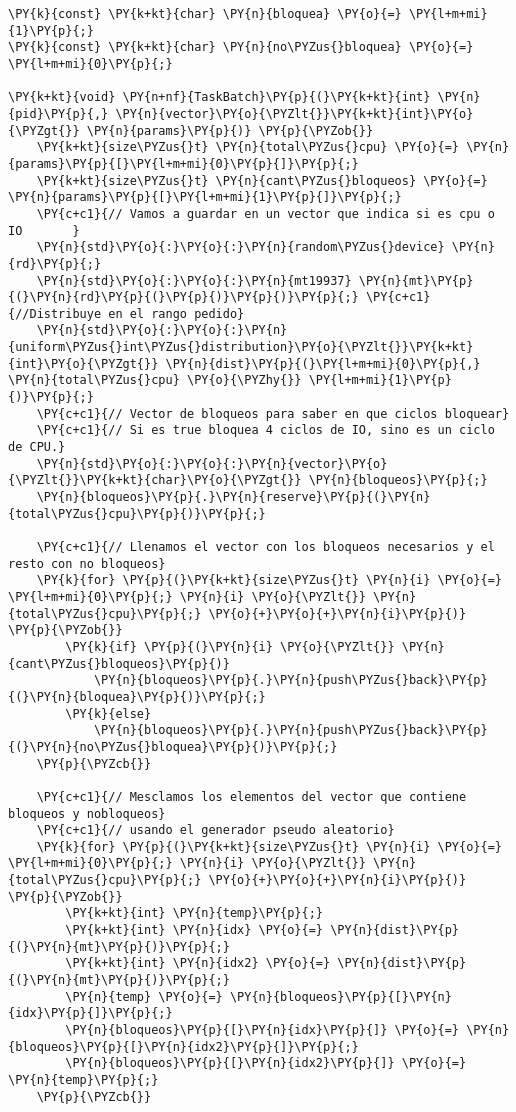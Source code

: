 \begin{Verbatim}[commandchars=\\\{\}]
\PY{k}{const} \PY{k+kt}{char} \PY{n}{bloquea} \PY{o}{=} \PY{l+m+mi}{1}\PY{p}{;}
\PY{k}{const} \PY{k+kt}{char} \PY{n}{no\PYZus{}bloquea} \PY{o}{=} \PY{l+m+mi}{0}\PY{p}{;}

\PY{k+kt}{void} \PY{n+nf}{TaskBatch}\PY{p}{(}\PY{k+kt}{int} \PY{n}{pid}\PY{p}{,} \PY{n}{vector}\PY{o}{\PYZlt{}}\PY{k+kt}{int}\PY{o}{\PYZgt{}} \PY{n}{params}\PY{p}{)} \PY{p}{\PYZob{}}
    \PY{k+kt}{size\PYZus{}t} \PY{n}{total\PYZus{}cpu} \PY{o}{=} \PY{n}{params}\PY{p}{[}\PY{l+m+mi}{0}\PY{p}{]}\PY{p}{;}
    \PY{k+kt}{size\PYZus{}t} \PY{n}{cant\PYZus{}bloqueos} \PY{o}{=} \PY{n}{params}\PY{p}{[}\PY{l+m+mi}{1}\PY{p}{]}\PY{p}{;}       
    \PY{c+c1}{// Vamos a guardar en un vector que indica si es cpu o IO       }
    \PY{n}{std}\PY{o}{:}\PY{o}{:}\PY{n}{random\PYZus{}device} \PY{n}{rd}\PY{p}{;}
    \PY{n}{std}\PY{o}{:}\PY{o}{:}\PY{n}{mt19937} \PY{n}{mt}\PY{p}{(}\PY{n}{rd}\PY{p}{(}\PY{p}{)}\PY{p}{)}\PY{p}{;} \PY{c+c1}{//Distribuye en el rango pedido}
    \PY{n}{std}\PY{o}{:}\PY{o}{:}\PY{n}{uniform\PYZus{}int\PYZus{}distribution}\PY{o}{\PYZlt{}}\PY{k+kt}{int}\PY{o}{\PYZgt{}} \PY{n}{dist}\PY{p}{(}\PY{l+m+mi}{0}\PY{p}{,} \PY{n}{total\PYZus{}cpu} \PY{o}{\PYZhy{}} \PY{l+m+mi}{1}\PY{p}{)}\PY{p}{;}
    \PY{c+c1}{// Vector de bloqueos para saber en que ciclos bloquear}
    \PY{c+c1}{// Si es true bloquea 4 ciclos de IO, sino es un ciclo de CPU.}
    \PY{n}{std}\PY{o}{:}\PY{o}{:}\PY{n}{vector}\PY{o}{\PYZlt{}}\PY{k+kt}{char}\PY{o}{\PYZgt{}} \PY{n}{bloqueos}\PY{p}{;}  
    \PY{n}{bloqueos}\PY{p}{.}\PY{n}{reserve}\PY{p}{(}\PY{n}{total\PYZus{}cpu}\PY{p}{)}\PY{p}{;}

    \PY{c+c1}{// Llenamos el vector con los bloqueos necesarios y el resto con no bloqueos}
    \PY{k}{for} \PY{p}{(}\PY{k+kt}{size\PYZus{}t} \PY{n}{i} \PY{o}{=} \PY{l+m+mi}{0}\PY{p}{;} \PY{n}{i} \PY{o}{\PYZlt{}} \PY{n}{total\PYZus{}cpu}\PY{p}{;} \PY{o}{+}\PY{o}{+}\PY{n}{i}\PY{p}{)} \PY{p}{\PYZob{}}
        \PY{k}{if} \PY{p}{(}\PY{n}{i} \PY{o}{\PYZlt{}} \PY{n}{cant\PYZus{}bloqueos}\PY{p}{)}
            \PY{n}{bloqueos}\PY{p}{.}\PY{n}{push\PYZus{}back}\PY{p}{(}\PY{n}{bloquea}\PY{p}{)}\PY{p}{;}
        \PY{k}{else} 
            \PY{n}{bloqueos}\PY{p}{.}\PY{n}{push\PYZus{}back}\PY{p}{(}\PY{n}{no\PYZus{}bloquea}\PY{p}{)}\PY{p}{;}
    \PY{p}{\PYZcb{}}

    \PY{c+c1}{// Mesclamos los elementos del vector que contiene bloqueos y nobloqueos}
    \PY{c+c1}{// usando el generador pseudo aleatorio}
    \PY{k}{for} \PY{p}{(}\PY{k+kt}{size\PYZus{}t} \PY{n}{i} \PY{o}{=} \PY{l+m+mi}{0}\PY{p}{;} \PY{n}{i} \PY{o}{\PYZlt{}} \PY{n}{total\PYZus{}cpu}\PY{p}{;} \PY{o}{+}\PY{o}{+}\PY{n}{i}\PY{p}{)} \PY{p}{\PYZob{}}
        \PY{k+kt}{int} \PY{n}{temp}\PY{p}{;}
        \PY{k+kt}{int} \PY{n}{idx} \PY{o}{=} \PY{n}{dist}\PY{p}{(}\PY{n}{mt}\PY{p}{)}\PY{p}{;}
        \PY{k+kt}{int} \PY{n}{idx2} \PY{o}{=} \PY{n}{dist}\PY{p}{(}\PY{n}{mt}\PY{p}{)}\PY{p}{;}
        \PY{n}{temp} \PY{o}{=} \PY{n}{bloqueos}\PY{p}{[}\PY{n}{idx}\PY{p}{]}\PY{p}{;}
        \PY{n}{bloqueos}\PY{p}{[}\PY{n}{idx}\PY{p}{]} \PY{o}{=} \PY{n}{bloqueos}\PY{p}{[}\PY{n}{idx2}\PY{p}{]}\PY{p}{;}
        \PY{n}{bloqueos}\PY{p}{[}\PY{n}{idx2}\PY{p}{]} \PY{o}{=} \PY{n}{temp}\PY{p}{;}
    \PY{p}{\PYZcb{}}


\end{Verbatim}
